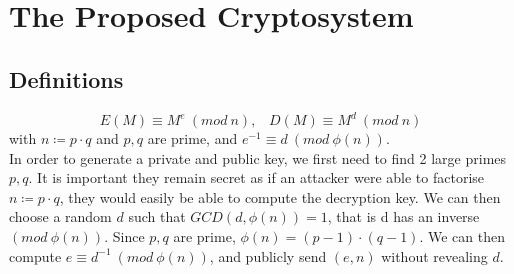 \documentclass{article}
\begin{document}
\section{The Proposed Cryptosystem}
\subsection{Definitions}
\[ E(M) \equiv M^e \: (mod \: n),\;\;\; D(M) \equiv M^d \: (mod \: n)\]
with $ n \coloneqq p \cdot q $ and $p, q$ are prime, and $e^{-1} \equiv d \: (mod \: \phi (n))$. \\
In order to generate a private and public key, we first need to find 2 large primes $p, q$.
It is important they remain secret as if an attacker were able to factorise
$ n \coloneqq p \cdot q $,
they would easily be able to compute the decryption key. We can then choose a random $d$ such that $GCD(d, \phi (n)) = 1$,
that is d has an inverse $(mod \: \phi(n))$.
Since $p, q$ are prime, $\phi(n) = (p-1) \cdot (q-1) $.
We can then compute $e \equiv d^{-1} \: (mod \: \phi(n))$,
and publicly send $(e, n)$ without revealing $d$.
\end{document}
